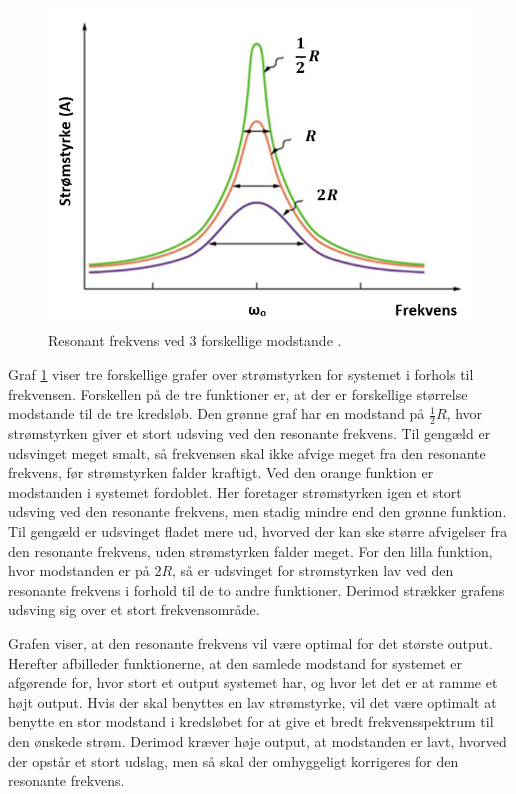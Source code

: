 \begin{figure}[H]
\centering
\includegraphics[scale=0.75]{Vildledning/Schematics/Resonanskurver}
\caption{Resonant frekvens ved 3 forskellige modstande \cite{Bresonant}.}
\label{figure:resonantfrekvens}
\end{figure}

Graf \ref{figure:resonantfrekvens} viser tre forskellige grafer over strømstyrken for systemet i forhols til frekvensen. Forskellen på de tre funktioner er, at der er forskellige størrelse modstande til de tre kredsløb. Den grønne graf har en modstand på $\frac{1}{2} R$, hvor strømstyrken giver et stort udsving ved den resonante frekvens. Til gengæld er udsvinget meget smalt, så frekvensen skal ikke afvige meget fra den resonante frekvens, før strømstyrken falder kraftigt. Ved den orange funktion er modstanden i systemet fordoblet. Her foretager strømstyrken igen et stort udsving ved den resonante frekvens, men stadig mindre end den grønne funktion. Til gengæld er udsvinget fladet mere ud, hvorved der kan ske større afvigelser fra den resonante frekvens, uden strømstyrken falder meget. For den lilla funktion, hvor modstanden er på $2 R$, så er udsvinget for strømstyrken lav ved den resonante frekvens i forhold til de to andre funktioner. Derimod strækker grafens udsving sig over et stort frekvensområde.

Grafen viser, at den resonante frekvens vil være optimal for det største output. Herefter afbilleder funktionerne, at den samlede modstand for systemet er afgørende for, hvor stort et output systemet har, og hvor let det er at ramme et højt output. Hvis der skal benyttes en lav strømstyrke, vil det være optimalt at benytte en stor modstand i kredsløbet for at give et bredt frekvensspektrum til den ønskede strøm. Derimod kræver høje output, at modstanden er lavt, hvorved der opstår et stort udslag, men så skal der omhyggeligt korrigeres for den resonante frekvens.

